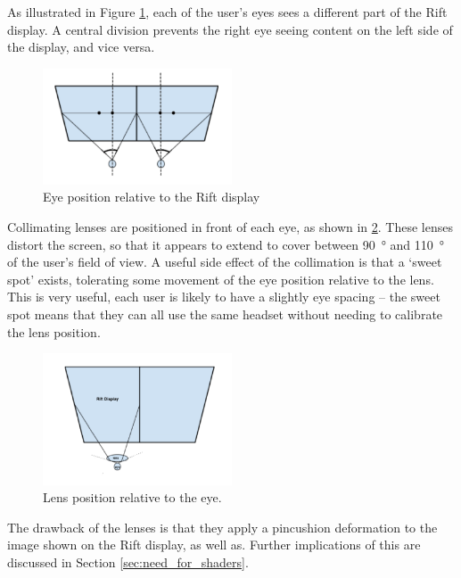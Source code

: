 \documentclass[MSc,paper=a4,pagesize=auto]{icldt}
\begin{document}
As illustrated in Figure \ref{fig:rift_display_1}, each of the user's eyes sees a different part of the Rift display. A central division prevents the right eye seeing content on the left side of the display, and vice versa.

\begin{figure}[htbp!]
    \centering
    \includegraphics[width=0.5\textwidth]{resources/rift_display_1}
    \caption{Eye position relative to the Rift display}
    \label{fig:rift_display_1}
\end{figure}

Collimating lenses are positioned in front of each eye, as shown in \ref{fig:rift_display_2}. These lenses distort the screen, so that it appears to extend to cover between \SI{90}{\degree} and \SI{110}{\degree} of the user's field of view. A useful side effect of the collimation is that a `sweet spot' exists, tolerating some movement of the eye position relative to the lens. This is very useful, each user is likely to have a slightly eye spacing -- the sweet spot means that they can all use the same headset without needing to calibrate the lens position. 

\begin{figure}[htbp!]
    \centering
    \includegraphics[width=0.5\textwidth]{resources/rift_display_2}
    \caption{Lens position relative to the eye.}
    \label{fig:rift_display_2}
\end{figure}

The drawback of the lenses is that they apply a pincushion deformation to the image shown on the Rift display, as well as. Further implications of this are discussed in Section \ref{sec:need_for_shaders}.
\end{document}
